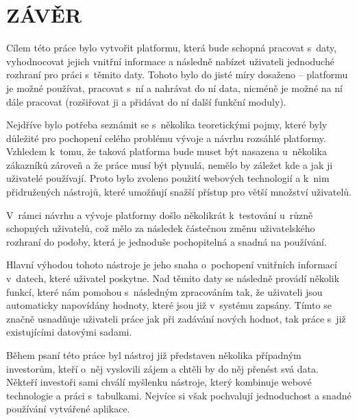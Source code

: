 \chapter*{ZÁVĚR}
\par Cílem této práce bylo vytvořit platformu, která bude schopná pracovat s~daty, vyhodnocovat jejich vnitřní informace a následně nabízet uživateli jednoduché rozhraní pro práci s~těmito daty. Tohoto bylo do jisté míry dosaženo -- platformu je možné používat, pracovat s~ní a nahrávat do ní data, nicméně je možné na ní dále pracovat (rozšiřovat ji a přidávat do ní další funkční moduly).

\par Nejdříve bylo potřeba seznámit se s~několika teoretickými pojmy, které byly důležité pro pochopení celého problému vývoje a návrhu rozsáhlé platformy. Vzhledem k~tomu, že taková platforma bude muset být nasazena u~několika zákazníků zároveň a že práce musí být plynulá, nemělo by záležet kde a jak ji uživatelé používají. Proto bylo zvoleno použití webových technologií a k~nim přidružených nástrojů, které umožňují snažší přístup pro větší množství uživatelů.

\par V~rámci návrhu a vývoje platformy došlo několikrát k~testování u~různě schopných uživatelů, což mělo za následek částečnou změnu uživatelského rozhraní do podoby, která je  jednoduše pochopitelná a snadná na používání.

\par Hlavní výhodou tohoto nástroje je jeho snaha o~pochopení vnitřních informací v~datech, které uživatel poskytne. Nad těmito daty se následně provádí několik funkcí, které nám pomohou s~následným zpracováním tak, že uživateli jsou automaticky napovídány hodnoty, které jsou již v~systému zapsány. Tímto se značně usnadňuje uživateli práce jak při zadávání nových hodnot, tak práce s~již existujícími datovými sadami.

\par Během psaní této práce byl nástroj již představen několika případným investorům, kteří o~něj vyslovili zájem a chtěli by do něj přenést svá data. Někteří investoři sami chválí myšlenku nástroje, který kombinuje webové technologie a práci s~tabulkami. Nejvíce si však pochvalují jednoduchost a snadné používání vytvářené aplikace.